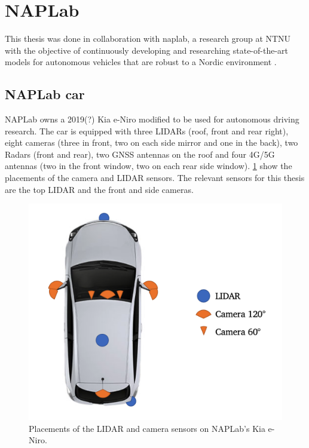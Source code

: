\section{NAPLab}


This thesis was done in collaboration with \acrfull{naplab}, a research group at NTNU with the objective of continuously developing and researching state-of-the-art models for autonomous vehicles that are robust to a Nordic environment \cite{naplab}. 

\subsection{NAPLab car}
 NAPLab owns a 2019(?) Kia e-Niro modified to be used for autonomous driving research. The car is equipped with three LIDARs (roof, front and rear right), eight cameras (three in front, two on each side mirror and one in the back), two Radars (front and rear), two GNSS antennas on the roof and four 4G/5G antennas (two in the front window, two on each rear side window). \cref{fig:kia-sensors} show the placements of the camera and LIDAR sensors. The relevant sensors for this thesis are the top LIDAR and the front and side cameras.

 \begin{figure}[htbp]
    \centering
    \includegraphics[width=.8\textwidth]{chapters/2-background/figures/kia-sensors.png}
    \caption{Placements of the LIDAR and camera sensors on NAPLab's Kia e-Niro.}
    \label{fig:kia-sensors}
\end{figure}
